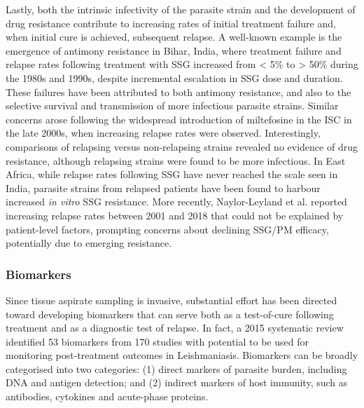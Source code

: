 
Lastly, both the intrinsic infectivity of the parasite strain and the development of drug resistance contribute to increasing rates of initial treatment failure and, when initial cure is achieved, subsequent relapse. A well-known example is the emergence of antimony resistance in Bihar, India, where treatment failure and relapse rates following treatment with SSG increased from < 5\% to > 50\% during the 1980s and 1990s, despite incremental escalation in SSG dose and duration\cite{olliaro2005, sundar2001}. These failures have been attributed to both antimony resistance\cite{jeddi2011}, and also to the selective survival and transmission of more infectious parasite strains\cite{vanaerschot2011}. Similar concerns arose following the widespread introduction of miltefosine in the ISC in the late 2000s, when increasing relapse rates were observed\cite{rijal2013, sundar2012, singh2016}. Interestingly, comparisons of relapsing versus non-relapsing strains revealed no evidence of drug resistance, although relapsing strains were found to be more infectious\cite{rai2013}. In East Africa, while relapse rates following SSG have never reached the scale seen in India, parasite strains from relapsed patients have been found to harbour increased \textit{in vitro} SSG resistance\cite{mukhtar2003}. More recently, Naylor-Leyland et al. reported increasing relapse rates between 2001 and 2018 that could not be explained by patient-level factors, prompting concerns about declining SSG/PM efficacy, potentially due to emerging resistance\cite{naylor-leyland2022}.


\subsubsection{Biomarkers\label{sec:biomarkers}}

Since tissue aspirate sampling is invasive, substantial effort has been directed toward developing biomarkers that can serve both as a test-of-cure following treatment and as a diagnostic test of relapse\cite{WHO2024_Leishmaniasis}. In fact, a 2015 systematic review identified 53 biomarkers from 170 studies with potential to be used for monitoring post-treatment outcomes in Leishmaniasis\cite{kip2015}. Biomarkers can be broadly categorised into two categories: (1) direct markers of parasite burden, including DNA and antigen detection; and (2) indirect markers of host immunity, such as antibodies, cytokines and acute-phase proteins.


